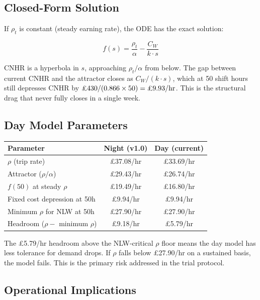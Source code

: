 \documentclass[a4paper,11pt]{article}
\begin{document}
\subsection{Closed-Form Solution}

If $\rho_t$ is constant (steady earning rate), the ODE has the exact solution:

\begin{equation}
\boxed{f(s) = \frac{\rho_t}{\alpha} - \frac{C_W}{k \cdot s}}
\end{equation}

CNHR is a hyperbola in $s$, approaching $\rho_t / \alpha$ from below. The gap between current CNHR and the attractor closes as $C_W / (k \cdot s)$, which at 50 shift hours still depresses CNHR by $\text{\pounds430} / (0.866 \times 50) = \text{\pounds9.93/hr}$. This is the structural drag that never fully closes in a single week.

\subsection{Day Model Parameters}

\begin{tabularx}{\textwidth}{X C C}
\toprule
\textbf{Parameter} & \textbf{Night (v1.0)} & \textbf{Day (current)} \\
\midrule
$\rho$ (trip rate) & \pounds37.08/hr & \pounds33.69/hr \\
Attractor ($\rho / \alpha$) & \pounds29.43/hr & \pounds26.74/hr \\
$f(50)$ at steady $\rho$ & \pounds19.49/hr & \pounds16.80/hr \\
Fixed cost depression at 50h & \pounds9.94/hr & \pounds9.94/hr \\
Minimum $\rho$ for NLW at 50h & \pounds27.90/hr & \pounds27.90/hr \\
Headroom ($\rho -$ minimum $\rho$) & \pounds9.18/hr & \pounds5.79/hr \\
\bottomrule
\end{tabularx}

\medskip
The \pounds5.79/hr headroom above the NLW-critical $\rho$ floor means the day model has less tolerance for demand drops. If $\rho$ falls below \pounds27.90/hr on a sustained basis, the model fails. This is the primary risk addressed in the trial protocol.

\subsection{Operational Implications}
\end{document}
